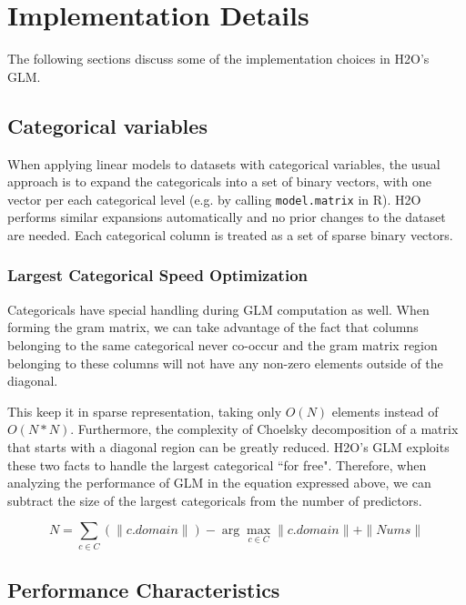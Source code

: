 \section{Implementation Details}

The following sections discuss some of the implementation choices in H2O's GLM.

\subsection{Categorical variables}

When applying linear models to datasets with categorical variables, the usual approach is to expand the
categoricals into a set of binary vectors, with one vector per each categorical level (e.g. by calling
{\texttt{model.matrix}} in R). H2O performs similar expansions automatically and no prior changes to the dataset
are needed. Each categorical column is treated as a set of sparse binary vectors.

\subsubsection{Largest Categorical Speed Optimization}

Categoricals have special handling during GLM computation as well. When forming the gram matrix, we can take
advantage of the fact that columns belonging to the same categorical never co-occur and the gram matrix region
belonging to these columns will not have any non-zero elements outside of the diagonal. 

This keep it in sparse representation, taking only $O(N)$ elements instead of $O(N*N)$. Furthermore, the complexity of Choelsky
decomposition of a matrix that starts with a diagonal region can be greatly reduced. H2O's GLM exploits these two
facts to handle the largest categorical ``for free". Therefore, when analyzing the performance of GLM in the
equation expressed above, we can subtract the size of the largest categoricals from the number of predictors.

$$N = \sum_{c \in C} (\|c.domain\|) - \arg\max_{c \in C} \|c.domain\| + \|Nums\| $$

\subsection{Performance Characteristics}

